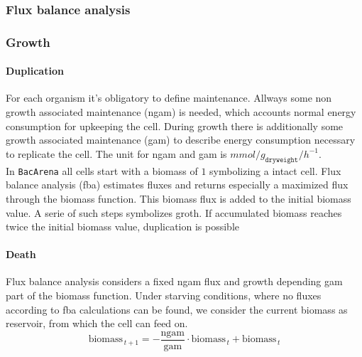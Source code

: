 \subsubsection{Flux balance analysis}

\subsubsection{Growth}
\paragraph{Duplication}
For each organism it's obligatory to define maintenance.
Allways some non growth associated maintenance (ngam) is needed, which accounts normal energy consumption for upkeeping the cell.
During growth there is additionally some growth associated maintenance (gam) to describe energy consumption necessary to replicate the cell. The unit for ngam and gam is $mmol/g_{\texttt{dryweight}}/h^{-1}$\cite{Thiele2010}.\\
In \texttt{BacArena} all cells start with a biomass of $1$ symbolizing a intact cell.
Flux balance analysis (fba) estimates fluxes and returns especially a maximized flux through the biomass function.
This biomass flux is added to the initial biomass value. A serie of such steps symbolizes groth.
If accumulated biomass reaches twice the initial biomass value, duplication is possible
\paragraph{Death}
Flux balance analysis considers a fixed ngam flux and growth depending gam part of the biomass function.
Under starving conditions, where no fluxes according to fba calculations can be found, we consider the current biomass as reservoir, from which the cell can feed on.
\[
  \textrm{biomass}_{\,t+1} = -\frac{\textrm{ngam}}{\textrm{gam}}\cdot \textrm{biomass}_{\,t}+\textrm{biomass}_{\,t}
\]
